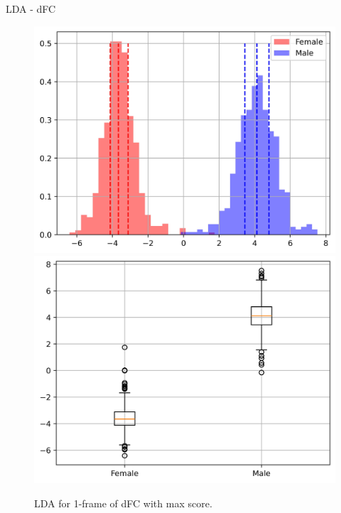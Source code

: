 \documentclass{beamer}
\begin{document}
\begin{frame}{LDA - dFC}
\begin{figure}[H]
{\begin{minipage}[b]{0.3\textwidth}
                \includegraphics[width=1\textwidth]{../Analysis/LDA/node=50_size=480_step=180_rho=0.1/hist_11.jpg}
                \includegraphics[width=1\textwidth]{../Analysis/LDA/node=50_size=480_step=180_rho=0.1/box_11.jpg}
            \end{minipage}
        }
        \caption{LDA for 1-frame of dFC with max score.}
    \end{figure}

\end{frame}
\end{document}
